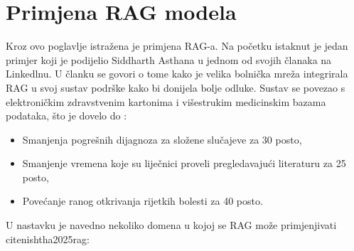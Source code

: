 \documentclass[]{foi}
\begin{document}
\section{Primjena RAG modela}

Kroz ovo poglavlje istražena je primjena RAG-a. Na početku istaknut je jedan primjer koji je podijelio Siddharth Asthana u jednom od svojih
članaka na Linkedlnu. U članku se govori o tome kako je velika bolnička mreža integrirala RAG u svoj sustav podrške kako bi donijela bolje odluke.
Sustav se povezao s elektroničkim zdravstvenim kartonima i višestrukim medicinskim bazama podataka, što je dovelo do \cite{siddharth2025rag}:
\begin{itemize}
    \item Smanjenja pogrešnih dijagnoza za složene slučajeve za 30 posto,
    \item Smanjenje vremena koje su liječnici proveli pregledavajući literaturu za 25 posto,
    \item Povećanje ranog otkrivanja rijetkih bolesti za 40 posto.
\end{itemize}

U nastavku je navedno nekoliko domena u kojoj se RAG može primjenjivati cite{nishtha2025rag}:
\end{document}
